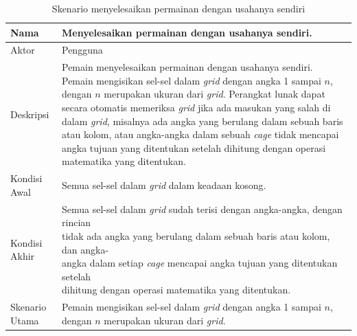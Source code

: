 \begin{enumerate}
\begin{table}
\centering
\captionsetup{justification=centering}
\caption[Skenario menyelesaikan permainan dengan usahanya sendiri]{Skenario menyelesaikan permainan dengan usahanya sendiri}
\begin{tabular}{| l || l |}
\hline
Nama & Menyelesaikan permainan dengan usahanya sendiri. \\
\hline
Aktor & Pengguna \\
\hline
Deskripsi & \makecell[l]{Pemain menyelesaikan permainan dengan usahanya sendiri. Pemain \\ mengisikan sel-sel dalam \textit{grid} dengan angka 1 sampai \begin{math}n\end{math}, dengan \begin{math}n\end{math} \\ merupakan ukuran dari \textit{grid}. Perangkat lunak dapat secara otomatis \\ memeriksa \textit{grid} jika ada masukan yang salah di dalam \textit{grid}, misalnya ada \\ angka yang berulang dalam sebuah baris atau kolom, atau angka-angka \\ dalam sebuah \textit{cage} tidak mencapai angka tujuan yang ditentukan setelah \\ dihitung dengan operasi matematika yang ditentukan.} \\
\hline
Kondisi Awal & Semua sel-sel dalam \textit{grid} dalam keadaan kosong. \\
\hline
Kondisi Akhir & \makecell[l]{Semua sel-sel dalam \textit{grid} sudah terisi dengan angka-angka, dengan rincian \\ tidak ada angka yang berulang dalam sebuah baris atau kolom, dan angka- \\ angka dalam setiap \textit{cage} mencapai angka tujuan yang ditentukan setelah \\ dihitung dengan operasi matematika yang ditentukan.} \\
\hline
Skenario Utama & \makecell[l]{Pemain mengisikan sel-sel dalam \textit{grid} dengan angka 1 sampai \begin{math}n\end{math}, dengan \begin{math}n\end{math} \\ merupakan ukuran dari \textit{grid}.} \\
\hline
\end{tabular}
\label{tab:analisisplay}
\end{table}


\end{enumerate}
